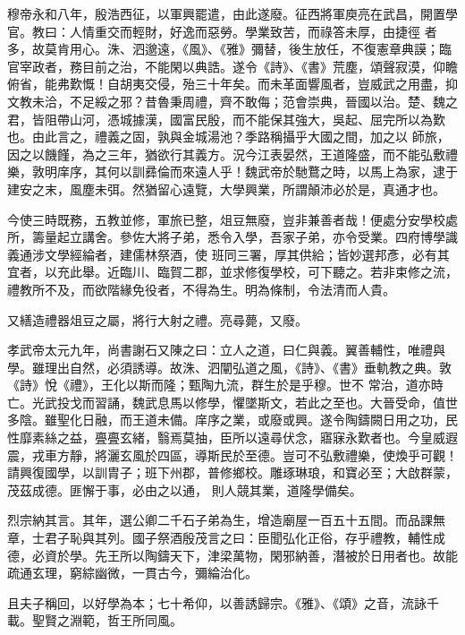 \begin{pinyinscope}
 穆帝永和八年，殷浩西征，以軍興罷遣，由此遂廢。征西將軍庾亮在武昌，開置學官。教曰：人情重交而輕財，好逸而惡勞。學業致苦，而祿答未厚，由捷徑
 者多，故莫肯用心。洙、泗邈遠，《風》、《雅》彌替，後生放任，不復憲章典謨；臨官宰政者，務目前之治，不能閑以典誥。遂令《詩》、《書》荒塵，頌聲寂漠，仰瞻俯省，能弗歎慨！自胡夷交侵，殆三十年矣。而未革面響風者，豈威武之用盡，抑文教未洽，不足綏之邪？昔魯秉周禮，齊不敢侮；范會崇典，晉國以治。楚、魏之君，皆阻帶山河，憑城據漢，國富民殷，而不能保其強大，吳起、屈完所以為歎也。由此言之，禮義之固，孰與金城湯池？季路稱攝乎大國之間，加之以
 師旅，因之以饑饉，為之三年，猶欲行其義方。況今江表晏然，王道隆盛，而不能弘敷禮樂，敦明庠序，其何以訓彞倫而來遠人乎！魏武帝於馳鶩之時，以馬上為家，逮于建安之末，風塵未弭。然猶留心遠覽，大學興業，所謂顛沛必於是，真通才也。



 今使三時既務，五教並修，軍旅已整，俎豆無廢，豈非兼善者哉！便處分安學校處所，籌量起立講舍。參佐大將子弟，悉令入學，吾家子弟，亦令受業。四府博學識義通涉文學經綸者，建儒林祭酒，使
 班同三署，厚其供給；皆妙選邦彥，必有其宜者，以充此舉。近臨川、臨賀二郡，並求修復學校，可下聽之。若非束修之流，禮教所不及，而欲階緣免役者，不得為生。明為條制，令法清而人貴。



 又繕造禮器俎豆之屬，將行大射之禮。亮尋薨，又廢。



 孝武帝太元九年，尚書謝石又陳之曰：立人之道，曰仁與義。翼善輔性，唯禮與學。雖理出自然，必須誘導。故洙、泗闡弘道之風，《詩》、《書》垂軌教之典。敦《詩》悅《禮》，王化以斯而隆；甄陶九流，群生於是乎穆。世不
 常治，道亦時亡。光武投戈而習誦，魏武息馬以修學，懼墜斯文，若此之至也。大晉受命，值世多陰。雖聖化日融，而王道未備。庠序之業，或廢或興。遂令陶鑄闕日用之功，民性靡素絲之益，亹亹玄緒，翳焉莫抽，臣所以遠尋伏念，寤寐永歎者也。今皇威遐震，戎車方靜，將灑玄風於四區，導斯民於至德。豈可不弘敷禮樂，使煥乎可觀！請興復國學，以訓胄子；班下州郡，普修鄉校。雕琢琳琅，和寶必至；大啟群蒙，茂茲成德。匪懈于事，必由之以通，
 則人競其業，道隆學備矣。



 烈宗納其言。其年，選公卿二千石子弟為生，增造廟屋一百五十五間。而品課無章，士君子恥與其列。國子祭酒殷茂言之曰：臣聞弘化正俗，存乎禮教，輔性成德，必資於學。先王所以陶鑄天下，津梁萬物，閑邪納善，潛被於日用者也。故能疏通玄理，窮綜幽微，一貫古今，彌綸治化。



 且夫子稱回，以好學為本；七十希仰，以善誘歸宗。《雅》、《頌》之音，流詠千載。聖賢之淵範，哲王所同風。




\end{pinyinscope}
